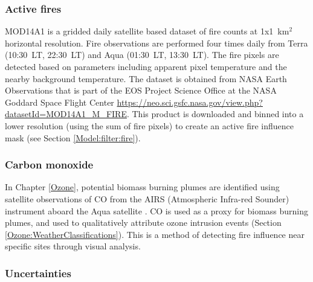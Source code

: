     \subsubsection{Active fires}
      \label{Model:datasets:MOD14A1}
      MOD14A1 is a gridded daily satellite based dataset of fire counts at 1x1~km$^2$ horizontal resolution.
      Fire observations are performed four times daily from Terra (10:30~LT, 22:30~LT) and Aqua (01:30~LT, 13:30~LT).
      The fire pixels are detected based on parameters including apparent pixel temperature and the nearby background temperature.
      The dataset is obtained from NASA Earth Observations that is part of the EOS Project Science Office at the NASA Goddard Space Flight Center \url{https://neo.sci.gsfc.nasa.gov/view.php?datasetId=MOD14A1_M_FIRE}.
      This product is downloaded and binned into a lower resolution (using the sum of fire pixels) to create an active fire influence mask (see Section \ref{Model:filter:fire}).
      
    \subsubsection{Carbon monoxide}
      \label{Model:datasets:AIRS}
      
      In Chapter \ref{Ozone}, potential biomass burning plumes are identified using satellite observations of CO from the AIRS (Atmospheric Infra-red Sounder) instrument aboard the Aqua satellite \parencite{AIRS3STD}.
      CO is used as a proxy for biomass burning plumes, and used to qualitatively attribute ozone intrusion events (Section \ref{Ozone:WeatherClassifications}).
      This is a method of detecting fire influence near specific sites through visual analysis.
      
  
    \subsubsection{Uncertainties}
      
